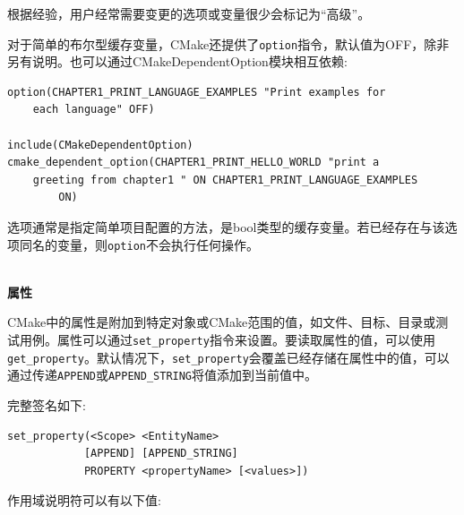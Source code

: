 根据经验，用户经常需要变更的选项或变量很少会标记为“高级”。

对于简单的布尔型缓存变量，CMake还提供了\texttt{option}指令，默认值为OFF，除非另有说明。也可以通过CMakeDependentOption模块相互依赖:

\begin{lstlisting}[style=styleCMake]
option(CHAPTER1_PRINT_LANGUAGE_EXAMPLES "Print examples for 
	each language" OFF)

include(CMakeDependentOption)
cmake_dependent_option(CHAPTER1_PRINT_HELLO_WORLD "print a
	greeting from chapter1 " ON CHAPTER1_PRINT_LANGUAGE_EXAMPLES
		ON)
\end{lstlisting}

选项通常是指定简单项目配置的方法，是bool类型的缓存变量。若已经存在与该选项同名的变量，则\texttt{option}不会执行任何操作。

\hspace*{\fill} \\ %
\noindent
\textbf{属性}

CMake中的属性是附加到特定对象或CMake范围的值，如文件、目标、目录或测试用例。属性可以通过\texttt{set\_property}指令来设置。要读取属性的值，可以使用\texttt{get\_property}。默认情况下，\texttt{set\_property}会覆盖已经存储在属性中的值，可以通过传递\texttt{APPEND}或\texttt{APPEND\_STRING}将值添加到当前值中。

完整签名如下:

\begin{lstlisting}[style=styleCMake]
set_property(<Scope> <EntityName>
			[APPEND] [APPEND_STRING]
			PROPERTY <propertyName> [<values>])
\end{lstlisting}

作用域说明符可以有以下值:

